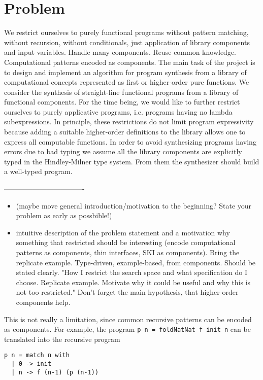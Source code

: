 \section{Problem}
We restrict ourselves to purely functional programs without pattern matching, without recursion, without conditionals, just application of library components and input variables. Handle many components. Reuse common knowledge. Computational patterns encoded as components.
The main task of the project is to design and implement an algorithm for program synthesis from a library of computational concepts represented as first or higher-order pure functions.
We consider the synthesis of straight-line functional programs from a library of functional components.  For the time being, we would like to further restrict ourselves to purely applicative programs, i.e. programs having no lambda subexpressions. In principle, these restrictions do not limit program expressivity because adding a suitable higher-order definitions to the library allows one to express all computable functions.  In order to avoid synthesizing programs having errors due to bad typing we assume all the library components are explicitly typed in the Hindley-Milner type system.  From them the synthesizer should build a well-typed program.






----------------------------------

\begin{itemize}
\item (maybe move general introduction/motivation to the beginning? State your problem as early as possbible!)
\item intuitive description of the problem statement and a motivation why something that restricted should be interesting (encode computational patterns as components, thin interfaces, SKI as components). Bring the replicate example. Type-driven, example-based, from components. Should be stated clearly. "How I restrict the search space and what specification do I choose. Replicate example. Motivate why it could be useful and why this is not too restricted." Don't forget the main hypothesis, that higher-order components help.
\end{itemize} 


This is not really a limitation, since common recursive patterns can be encoded as components. For example, the program \lstinline!p n = foldNatNat f init n! can be translated into the recursive program
\begin{lstlisting}[style=plain]
p n = match n with
  | 0 -> init
  | n -> f (n-1) (p (n-1))
\end{lstlisting}  

